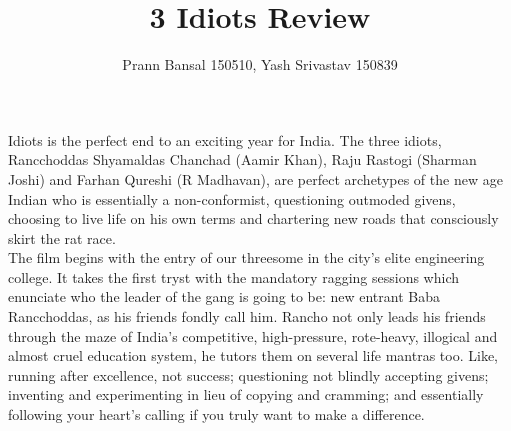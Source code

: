 \documentclass{article}
\title{3 Idiots Review}
\author{Prann Bansal 150510, Yash Srivastav 150839}
\begin{document}
 Idiots is the perfect end to an exciting year for India. The three idiots, Rancchoddas Shyamaldas Chanchad (Aamir Khan), Raju Rastogi (Sharman Joshi) and Farhan Qureshi (R Madhavan), are perfect archetypes of the new age Indian who is essentially a non-conformist, questioning outmoded givens, choosing to live life on his own terms and chartering new roads that consciously skirt the rat race.\\
 The film begins with the entry of our threesome in the city's elite engineering college. It takes the first tryst with the mandatory ragging sessions which enunciate who the leader of the gang is going to be: new entrant Baba Rancchoddas, as his friends fondly call him. Rancho not only leads his friends through the maze of India's competitive, high-pressure, rote-heavy, illogical and almost cruel education system, he tutors them on several life mantras too. Like, running after excellence, not success; questioning not blindly accepting givens; inventing and experimenting in lieu of copying and cramming; and essentially following your heart's calling if you truly want to make a difference.\\
\end{document}
